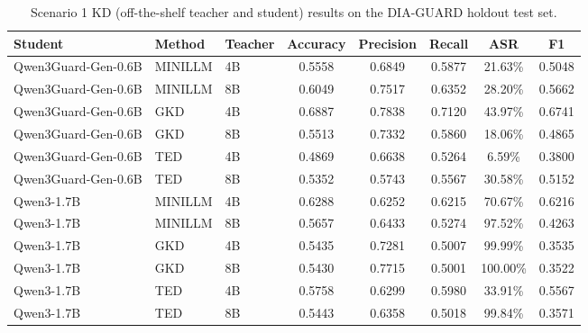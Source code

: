 \begin{table}[t]
\centering
\small
\begin{tabular}{lllccccc}
\toprule
Student & Method & Teacher & Accuracy & Precision & Recall & ASR & F1 \\
\midrule
Qwen3Guard-Gen-0.6B & MINILLM & 4B & 0.5558 & 0.6849 & 0.5877 & 21.63\% & 0.5048 \\
Qwen3Guard-Gen-0.6B & MINILLM & 8B & 0.6049 & 0.7517 & 0.6352 & 28.20\% & 0.5662 \\
Qwen3Guard-Gen-0.6B & GKD & 4B & 0.6887 & 0.7838 & 0.7120 & 43.97\% & 0.6741 \\
Qwen3Guard-Gen-0.6B & GKD & 8B & 0.5513 & 0.7332 & 0.5860 & 18.06\% & 0.4865 \\
Qwen3Guard-Gen-0.6B & TED & 4B & 0.4869 & 0.6638 & 0.5264 & 6.59\% & 0.3800 \\
Qwen3Guard-Gen-0.6B & TED & 8B & 0.5352 & 0.5743 & 0.5567 & 30.58\% & 0.5152 \\
Qwen3-1.7B & MINILLM & 4B & 0.6288 & 0.6252 & 0.6215 & 70.67\% & 0.6216 \\
Qwen3-1.7B & MINILLM & 8B & 0.5657 & 0.6433 & 0.5274 & 97.52\% & 0.4263 \\
Qwen3-1.7B & GKD & 4B & 0.5435 & 0.7281 & 0.5007 & 99.99\% & 0.3535 \\
Qwen3-1.7B & GKD & 8B & 0.5430 & 0.7715 & 0.5001 & 100.00\% & 0.3522 \\
Qwen3-1.7B & TED & 4B & 0.5758 & 0.6299 & 0.5980 & 33.91\% & 0.5567 \\
Qwen3-1.7B & TED & 8B & 0.5443 & 0.6358 & 0.5018 & 99.84\% & 0.3571 \\
\bottomrule
\end{tabular}
\caption{Scenario 1 KD (off-the-shelf teacher and student) results on the DIA-GUARD holdout test set.}
\label{tab:kd_scenario1}
\end{table}